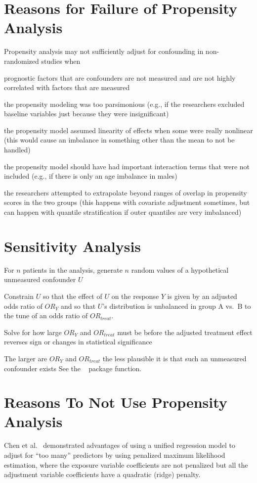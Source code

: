 \section{Reasons for Failure of Propensity Analysis}
Propensity analysis may not sufficiently adjust for confounding in non-randomized studies when
\bi
\item prognostic factors that are confounders are not measured and are not highly correlated with factors that are measured
\item the propensity modeling was too parsimonious (e.g., if the researchers excluded baseline variables just because they were insignificant)
\item the propensity model assumed linearity of effects when some were really nonlinear (this would cause an imbalance in something other than the mean to not be handled)
\item the propensity model should have had important interaction terms that were not included (e.g., if there is only an age imbalance in males)
\item the researchers attempted to extrapolate beyond ranges of overlap in propensity scores in the two groups (this happens with covariate adjustment sometimes, but can happen with quantile stratification if outer quantiles are very imbalanced)
\ei

\section{Sensitivity Analysis}
\bi
\item For $n$ patients in the analysis, generate $n$ random values of
  a hypothetical unmeasured confounder $U$
\item Constrain $U$ so that the effect of $U$ on the response $Y$ is
  given by an adjusted odds ratio of $OR_{Y}$ and so that $U$'s distribution is
  unbalanced in group A vs.\ B to the tune of an odds ratio of
  $OR_{treat}$.
\item Solve for how large $OR_{Y}$ and $OR_{treat}$ must be before the
  adjusted treatment effect reverses sign or changes in statistical
  significance
\item The larger are $OR_Y$ and $OR_{treat}$ the less plausible it is
  that such an unmeasured confounder exists
\ei
See the \R\  package  function.

\section{Reasons To Not Use Propensity Analysis}
Chen et al.~\cite{che16too} demonstrated advantages of using a unified
regression model to adjust for ``too many'' predictors by using
penalized maximum likelihood estimation, where the exposure variable
coefficients are not penalized but all the adjustment variable
coefficients have a quadratic (ridge) penalty.

